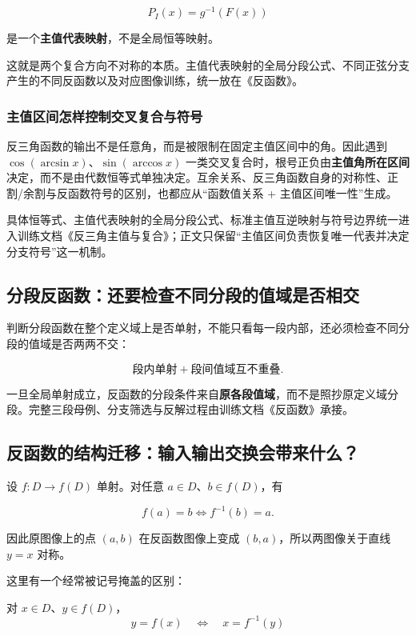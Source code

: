 \documentclass[11pt,a4paper]{ctexart}
\begin{document}
\[
P_I(x)=g^{-1}(F(x))
\]

是一个\textbf{主值代表映射}，不是全局恒等映射。

这就是两个复合方向不对称的本质。主值代表映射的全局分段公式、不同正弦分支产生的不同反函数以及对应图像训练，统一放在《反函数》。

\subsubsection{主值区间怎样控制交叉复合与符号}

反三角函数的输出不是任意角，而是被限制在固定主值区间中的角。因此遇到 $\cos(\arcsin x)$、$\sin(\arccos x)$ 一类交叉复合时，根号正负由\textbf{主值角所在区间}决定，而不是由代数恒等式单独决定。互余关系、反三角函数自身的对称性、正割/余割与反函数符号的区别，也都应从“函数值关系 + 主值区间唯一性”生成。

具体恒等式、主值代表映射的全局分段公式、标准主值互逆映射与符号边界统一进入训练文档《反三角主值与复合》；正文只保留“主值区间负责恢复唯一代表并决定分支符号”这一机制。

\subsection{分段反函数：还要检查不同分段的值域是否相交}

判断分段函数在整个定义域上是否单射，不能只看每一段内部，还必须检查不同分段的值域是否两两不交：

\[
\boxed{\text{段内单射}+\text{段间值域互不重叠}.}
\]

一旦全局单射成立，反函数的分段条件来自\textbf{原各段值域}，而不是照抄原定义域分段。完整三段母例、分支筛选与反解过程由训练文档《反函数》承接。

\subsection{反函数的结构迁移：输入输出交换会带来什么？}\label{ux53cdux51fdux6570ux7684ux7ed3ux6784ux7ee7ux627f}

设 \(f:D\to f(D)\) 单射。对任意 \(a\in D\)、\(b\in f(D)\)，有

\[
f(a)=b
\Longleftrightarrow
f^{-1}(b)=a.
\]

因此原图像上的点 \((a,b)\) 在反函数图像上变成 \((b,a)\)，所以两图像关于直线
\(y=x\) 对称。

这里有一个经常被记号掩盖的区别：

对 \(x\in D\)、\(y\in f(D)\)，
\[
y=f(x)
\quad\Longleftrightarrow\quad
x=f^{-1}(y)
\]
\end{document}
